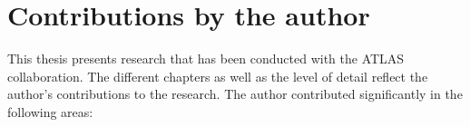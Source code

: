 



\section*{Contributions by the author}
This thesis presents research that has been conducted with the ATLAS collaboration.
The different chapters as well as the level of detail reflect the author's contributions to the research.
The author contributed significantly in the following areas:

